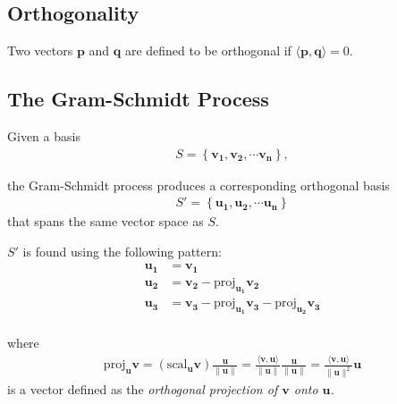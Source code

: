 \documentclass[a4paper,10pt]{report}
\newcommand{\norm}[1]{\lVert#1\rVert} 		%
\newcommand{\ip}[2]{\langle#1,#2\rangle}	%
\newcommand{\vb}[1]{\mathbf{#1}}		%
\begin{document}
  \subsection{Orthogonality}
    Two vectors $\vb{p}$ and $\vb{q}$ are defined to be orthogonal if $\ip{\vb{p}}{\vb{q}} = 0$.

  \subsection{The Gram-Schmidt Process}
    Given a basis
    \begin{align*}
      S = \left\{\mathbf{v_1, v_2, \cdots v_n}\right\},
    \end{align*}

    the Gram-Schmidt process produces a corresponding orthogonal basis
    \begin{align*}
      S' = \left\{\mathbf{u_1, u_2, \cdots u_n}\right\}
    \end{align*}
    that spans the same vector space as $S$.

    $S'$ is found using the following pattern:
    \begin{align*}
    \mathbf{u_1} &= \mathbf{v_1} \\
    \mathbf{u_2} &= \mathbf{v_2} - \text{proj}_{\mathbf{u_1}} \mathbf{v_2}\\
    \mathbf{u_3} &= \mathbf{v_3} - \text{proj}_{\mathbf{u_1}} \mathbf{v_3} - \text{proj}_{\mathbf{u_2}} \mathbf{v_3}\\
    \end{align*}

    where
    \begin{align*}
      \text{proj}_{\mathbf{u}} \mathbf{v} = (\text{scal}_{\mathbf{u}} \mathbf{v})\frac{\mathbf{u}}{\mathbf{\norm{u}}}
      = \frac{\langle \mathbf{v,u} \rangle}{\norm{\mathbf{u}}}\frac{\mathbf{u}}{\mathbf{\norm{u}}}
      = \frac{\ip{\vb{v}}{\vb{u}}}{\norm{\vb{u}}^2}\vb{u}
    \end{align*}
    is a vector defined as the \textit{orthogonal projection of $\vb{v}$ onto $\vb{u}$.}
\end{document}
